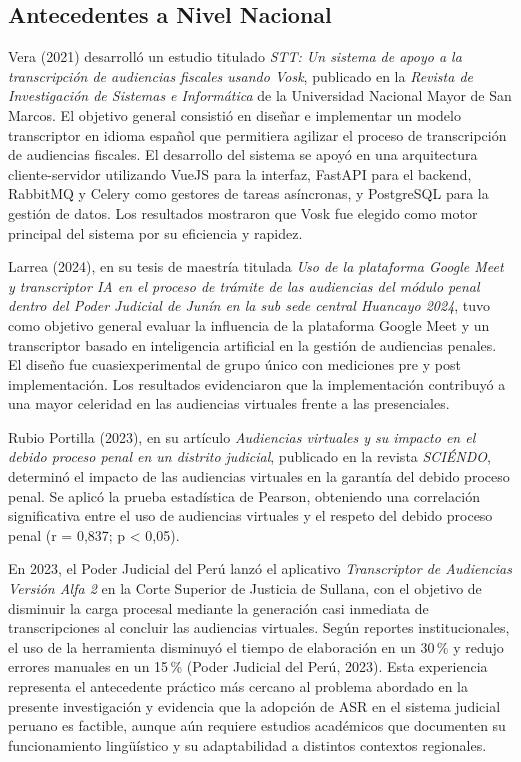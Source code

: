 \documentclass[12pt,a4paper,oneside]{report}
\begin{document}
\subsection{Antecedentes a Nivel Nacional}

Vera (2021) desarrolló un estudio titulado \textit{STT: Un sistema de apoyo a la transcripción de audiencias fiscales usando Vosk}, publicado en la \textit{Revista de Investigación de Sistemas e Informática} de la Universidad Nacional Mayor de San Marcos. El objetivo general consistió en diseñar e implementar un modelo transcriptor en idioma español que permitiera agilizar el proceso de transcripción de audiencias fiscales. El desarrollo del sistema se apoyó en una arquitectura cliente-servidor utilizando VueJS para la interfaz, FastAPI para el backend, RabbitMQ y Celery como gestores de tareas asíncronas, y PostgreSQL para la gestión de datos. Los resultados mostraron que Vosk fue elegido como motor principal del sistema por su eficiencia y rapidez.

Larrea (2024), en su tesis de maestría titulada \textit{Uso de la plataforma Google Meet y transcriptor IA en el proceso de trámite de las audiencias del módulo penal dentro del Poder Judicial de Junín en la sub sede central Huancayo 2024}, tuvo como objetivo general evaluar la influencia de la plataforma Google Meet y un transcriptor basado en inteligencia artificial en la gestión de audiencias penales. El diseño fue cuasiexperimental de grupo único con mediciones pre y post implementación. Los resultados evidenciaron que la implementación contribuyó a una mayor celeridad en las audiencias virtuales frente a las presenciales.

Rubio Portilla (2023), en su artículo \textit{Audiencias virtuales y su impacto en el debido proceso penal en un distrito judicial}, publicado en la revista \textit{SCIÉNDO}, determinó el impacto de las audiencias virtuales en la garantía del debido proceso penal. Se aplicó la prueba estadística de Pearson, obteniendo una correlación significativa entre el uso de audiencias virtuales y el respeto del debido proceso penal (r = 0,837; p < 0,05).

En 2023, el Poder Judicial del Perú lanzó el aplicativo \textit{Transcriptor de Audiencias Versión Alfa 2} en la Corte Superior de Justicia de Sullana, con el objetivo de disminuir la carga procesal mediante la generación casi inmediata de transcripciones al concluir las audiencias virtuales. Según reportes institucionales, el uso de la herramienta disminuyó el tiempo de elaboración en un 30\,\% y redujo errores manuales en un 15\,\% (Poder Judicial del Perú, 2023). Esta experiencia representa el antecedente práctico más cercano al problema abordado en la presente investigación y evidencia que la adopción de ASR en el sistema judicial peruano es factible, aunque aún requiere estudios académicos que documenten su funcionamiento lingüístico y su adaptabilidad a distintos contextos regionales.
\end{document}
